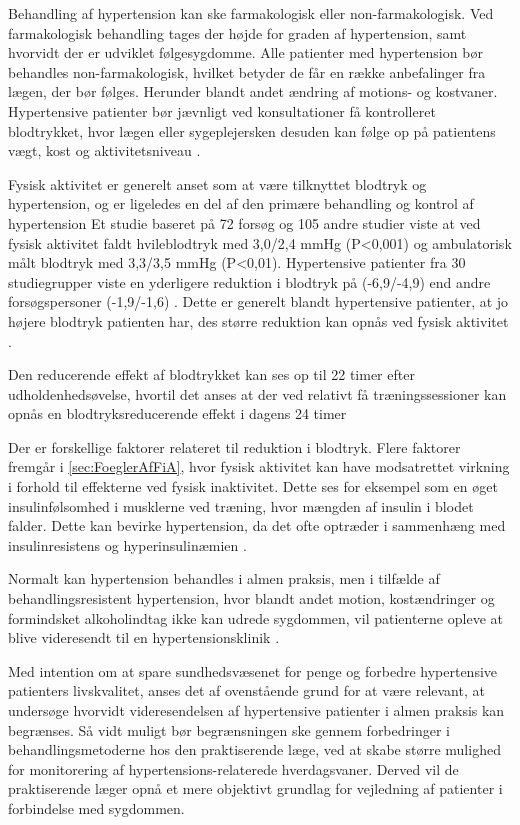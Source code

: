 Behandling af hypertension kan ske farmakologisk eller non-farmakologisk. Ved farmakologisk behandling tages der højde for graden af hypertension, samt hvorvidt der er udviklet følgesygdomme. Alle patienter med hypertension bør behandles non-farmakologisk, hvilket betyder de får en række anbefalinger fra lægen, der bør følges. Herunder blandt andet ændring af motions- og kostvaner. Hypertensive patienter bør jævnligt ved konsultationer få kontrolleret blodtrykket, hvor lægen eller sygeplejersken desuden kan følge op på patientens vægt, kost og aktivitetsniveau \cite{lodberg2016, bech2015}. 

Fysisk aktivitet er generelt anset som at være tilknyttet blodtryk og hypertension, og er ligeledes en del af den primære behandling og kontrol af hypertension \citep{kilde 1 og 2}
Et studie baseret på 72 forsøg og 105 andre studier viste at ved fysisk aktivitet faldt hvileblodtryk med 3,0/2,4 mmHg (P<0,001) og ambulatorisk målt blodtryk med 3,3/3,5 mmHg (P<0,01). 
Hypertensive patienter fra 30 studiegrupper viste en yderligere reduktion i blodtryk på (-6,9/-4,9) end andre forsøgspersoner (-1,9/-1,6) \citep{kilde 2}. 
Dette er generelt blandt hypertensive patienter, at jo højere blodtryk patienten har, des større reduktion kan opnås ved fysisk aktivitet \citep{pedersen2011, kilde 1}.

Den reducerende effekt af blodtrykket kan ses op til 22 timer efter udholdenhedsøvelse, hvortil det anses at der ved relativt få træningssessioner kan opnås en blodtryksreducerende effekt i dagens 24 timer \citep{kilde 1} 

Der er forskellige faktorer relateret til reduktion i blodtryk. Flere faktorer fremgår i \autoref{sec:FoeglerAfFiA}, hvor fysisk aktivitet kan have modsatrettet virkning i forhold til effekterne ved fysisk inaktivitet. Dette ses for eksempel som en øget insulinfølsomhed i musklerne ved træning, hvor mængden af insulin i blodet falder. Dette kan bevirke hypertension, da det ofte optræder i sammenhæng med insulinresistens og hyperinsulinæmien \citep{pedersen2011}.

Normalt kan hypertension behandles i almen praksis, men i tilfælde af behandlingsresistent hypertension, hvor blandt andet motion, kostændringer og formindsket alkoholindtag ikke kan udrede sygdommen, vil patienterne opleve at blive videresendt til en hypertensionsklinik \cite{lodberg2016, bech2015}.

Med intention om at spare sundhedsvæsenet for penge og forbedre hypertensive patienters livskvalitet, anses det af ovenstående grund for at være relevant, at undersøge hvorvidt videresendelsen af hypertensive patienter i almen praksis kan begrænses. Så vidt muligt bør begrænsningen ske gennem forbedringer i behandlingsmetoderne hos den praktiserende læge, ved at skabe større mulighed for monitorering af hypertensions-relaterede hverdagsvaner. Derved vil de praktiserende læger opnå et mere objektivt grundlag for vejledning af patienter i forbindelse med sygdommen.